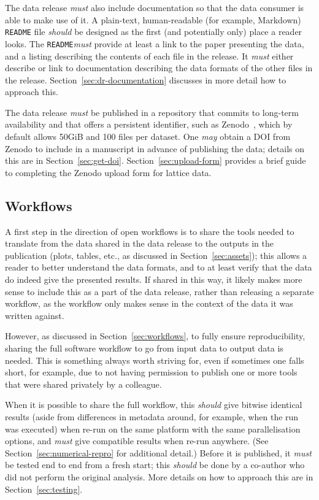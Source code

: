 \documentclass{article}
\newcommand\rfcword[1]{\emph{#1}\xspace}
\newcommand\must{\rfcword{must}}
\newcommand\should{\rfcword{should}}
\newcommand\may{\rfcword{may}}
\newcommand\filename[1]{\texttt{#1}\xspace}
\newcommand\readme{\filename{README}}
\begin{document}
The data release \must also include documentation
so that the data consumer is able to make use of it.
A plain-text, human-readable
(for example, Markdown)
\readme file \should be designed as the first
(and potentially only)
place a reader looks.
The \readme \must provide at least a link to the paper presenting the data,
and a listing describing the contents of each file in the release.
It \must either describe or link to documentation describing
the data formats of the other files in the release.
Section~\ref{sec:dr-documentation} discusses in more detail how to approach this.

The data release \must be published in a repository that commits to long-term availability
and that offers a persistent identifier,
such as Zenodo~\cite{zenodo},
which by default allows 50GiB and 100 files per dataset.
One \may obtain a DOI from Zenodo to include in a manuscript
in advance of publishing the data;
details on this are in Section~\ref{sec:get-doi}.
Section~\ref{sec:upload-form} provides
a brief guide to completing the Zenodo upload form for lattice data.

\subsection{Workflows}

A first step in the direction of open workflows
is to share the tools needed to translate
from the data shared in the data release
to the outputs in the publication
(plots, tables, etc.,
as discussed in Section~\ref{sec:assets});
this allows a reader to better understand the data formats,
and to at least verify that the data do indeed give the presented results.
If shared in this way,
it likely makes more sense to include this as a part of the data release,
rather than releasing a separate workflow,
as the workflow only makes sense in the context of the data it was written against.

However,
as discussed in Section~\ref{sec:workflows},
to fully ensure reproducibility,
sharing the full software workflow to go from input data to output data is needed.
This is something always worth striving for,
even if sometimes one falls short,
for example,
due to not having permission to publish
one or more tools that were shared privately by a colleague.

When it is possible to share the full workflow,
this \should give bitwise identical results
(aside from differences in metadata around,
for example,
when the run was executed)
when re-run on the same platform with the same parallelisation options,
and \must give compatible results when re-run anywhere.
(See Section~\ref{sec:numerical-repro} for additional detail.)
Before it is published,
it \must be tested end to end from a fresh start;
this \should be done by a co-author who did not perform the original analysis.
More details on how to approach this are in Section~\ref{sec:testing}.
\end{document}
